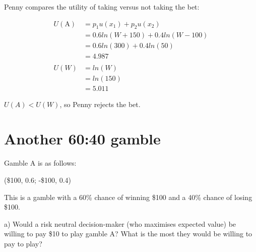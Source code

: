 \documentclass[
  letterpaper,
  DIV=11,
  numbers=noendperiod]{scrreprt}
\begin{document}
\begin{tcolorbox}[enhanced jigsaw, title=\textcolor{quarto-callout-tip-color}{\faLightbulb}\hspace{0.5em}{Answer}, toprule=.15mm, colback=white, breakable, titlerule=0mm, colframe=quarto-callout-tip-color-frame, coltitle=black, opacityback=0, rightrule=.15mm, colbacktitle=quarto-callout-tip-color!10!white, bottomtitle=1mm, opacitybacktitle=0.6, arc=.35mm, bottomrule=.15mm, toptitle=1mm, leftrule=.75mm, left=2mm]

Penny compares the utility of taking versus not taking the bet:

\begin{align*}
U(\text{A})&=p_1u(x_1)+p_2u(x_2) \\
&=0.6ln(W+150)+0.4ln(W-100) \\
&=0.6ln(300)+0.4ln(50) \\
&=4.987 \\
\\
U(W)&=ln(W) \\
&=ln(150) \\
&=5.011
\end{align*}

\(U(A)<U(W)\), so Penny rejects the bet.

\end{tcolorbox}

\hypertarget{another-6040-gamble}{%
\section{Another 60:40 gamble}\label{another-6040-gamble}}

Gamble A is as follows:

(\$100, 0.6; -\$100, 0.4)

This is a gamble with a 60\% chance of winning \$100 and a 40\% chance
of losing \$100.

a) Would a risk neutral decision-maker (who maximises expected value) be
willing to pay \$10 to play gamble A? What is the most they would be
willing to pay to play?
\end{document}
